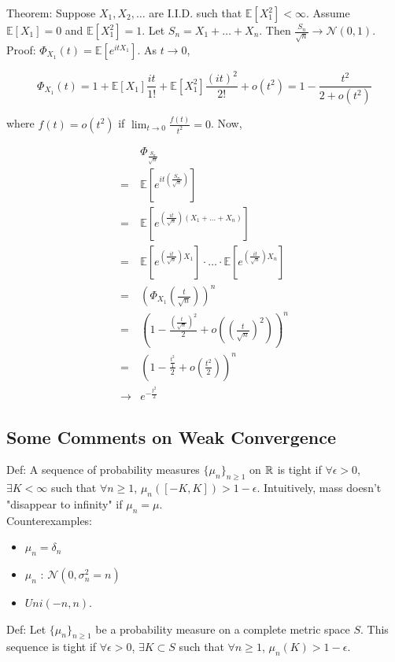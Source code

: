 \documentclass[english, 11pt]{article}
\begin{document}
Theorem: Suppose $X_1, X_2, \dots$ are I.I.D. such that $\mathbb{E}[X_1^2] < \infty$. Assume $\mathbb{E}[X_1] = 0$ and $\mathbb{E}[X_1^2] = 1$. Let $S_n = X_1 + \dots + X_n$. Then $\frac{S_n}{\sqrt{n}} \to \mathcal{N}(0, 1)$.\\

Proof: $\Phi_{X_1}(t) = \mathbb{E}[e^{itX_1}]$. As $t \to 0$,

\[\Phi_{X_1}(t) = 1 + \mathbb{E}[X_1] \frac{it}{1!} + \mathbb{E}[X_1^2] \frac{(it)^2}{2!} + o(t^2) = 1 - \frac{t^2}{2 + o(t^2)}\]

where $f(t) = o(t^2)$ if $\lim_{t \to 0} \frac{f(t)}{t^2}=0$. Now,

\begin{align*}
&\Phi_{\frac{S_n}{\sqrt{n}}}\\
=& \mathbb{E}[e^{it(\frac{S_n}{\sqrt{n}})}]\\
=& \mathbb{E}[e^{(\frac{it}{\sqrt{n}})(X_1 + \dots + X_n)}]\\
=& \mathbb{E}[e^{(\frac{it}{\sqrt{n}})X_1}] \cdot \dots \cdot \mathbb{E}[e^{(\frac{it}{\sqrt{n}})X_n}]\\
=&(\Phi_{X_1}(\frac{t}{\sqrt{n}}))^n\\
=& (1 - \frac{(\frac{t}{\sqrt{n}})^2}{2} + o((\frac{t}{\sqrt{n}})^2))^n\\
=& (1 - \frac{\frac{t^2}{1}}{2} + o(\frac{t^2}{2}))^n\\
\to & e^{-\frac{t^2}{2}}
\end{align*}

\subsection{Some Comments on Weak Convergence}

Def: A sequence of probability measures $\{\mu_n\}_{n \geq 1}$ on ${\mathbb{R}}$ is tight if $\forall \epsilon > 0$, $\exists K < \infty$ such that $\forall n \geq 1$, $\mu_n([-K, K]) > 1 - \epsilon$. Intuitively, mass doesn't "disappear to infinity" if $\mu_n = \mu$.\\

Counterexamples:

\begin{itemize}
	\item $\mu_n = \delta_n$
	\item $\mu_n$ : $\mathcal{N}(0, \sigma_n^2 = n)$
	\item $Uni(-n, n)$.
\end{itemize}

Def: Let $\{\mu_n\}_{n \geq 1}$ be a probability measure on a complete metric space $S$. This sequence is tight if $\forall \epsilon > 0$, $\exists K \subset S$ such that $\forall n \geq 1$, $\mu_n(K) > 1 - \epsilon$.\\
\end{document}
